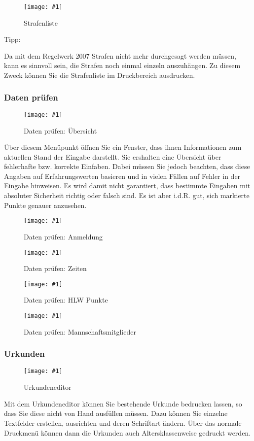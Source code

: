 \documentclass[11pt,a4paper,twoside,ngerman]{article}
\newcommand{\hsmimage}[3]{\begin{figure}[!ht]\centering\texttt{[image: \#1]}\caption{#3}\end{figure}}
\begin{document}
\hsmimage{pics/strafenliste}{.50\textwidth}{Strafenliste}
\begin{bfseries}Tipp:\end{bfseries} Da mit dem Regelwerk 2007 Strafen nicht mehr durchgesagt werden müssen, kann es sinnvoll sein, die Strafen noch einmal einzeln auszuhängen. Zu diesem Zweck können Sie die Strafenliste im Druckbereich ausdrucken.


\subsubsection*{Daten prüfen}

\hsmimage{pics/daten-pruefen}{.33\textwidth}{Daten prüfen: Übersicht}
\label{lbl:jauswertungmenus:datenpruefen}Über diesem Menüpunkt öffnen Sie ein Fenster, dass ihnen Informationen zum aktuellen Stand der Eingabe darstellt. Sie ershalten eine Übersicht über fehlerhafte bzw. korrekte Einfaben. Dabei müssen Sie jedoch beachten, dass diese Angaben auf Erfahrungswerten basieren und in vielen Fällen auf Fehler in der Eingabe hinweisen. Es wird damit nicht garantiert, dass bestimmte Eingaben mit absoluter Sicherheit richtig oder falsch sind. Es ist aber i.d.R. gut, sich markierte Punkte genauer anzusehen.


\hsmimage{pics/daten-pruefen-anmeldung}{.45\textwidth}{Daten prüfen: Anmeldung}

\hsmimage{pics/daten-pruefen-zeiten}{.80\textwidth}{Daten prüfen: Zeiten}

\hsmimage{pics/daten-pruefen-hlw}{.80\textwidth}{Daten prüfen: HLW Punkte}

\hsmimage{pics/daten-pruefen-mannschaftsmitglieder}{.80\textwidth}{Daten prüfen: Mannschaftsmitglieder}

\subsubsection*{Urkunden}

\hsmimage{pics/urkundeneditor}{.80\textwidth}{Urkundeneditor}
\label{lbl:jauswertungmenus:urkundeneditor}Mit dem Urkundeneditor können Sie bestehende Urkunde bedrucken lassen, so dass Sie diese nicht von Hand ausfüllen müssen. Dazu können Sie einzelne Textfelder erstellen, ausrichten und deren Schriftart ändern. Über das normale Druckmenü können dann die Urkunden auch Altersklassenweise gedruckt werden.
\end{document}
